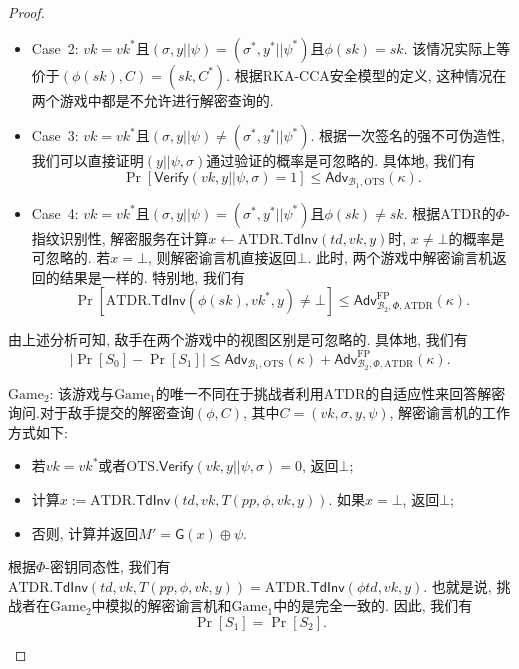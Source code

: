 \begin{proof}
\begin{trivlist}
\begin{itemize}
\item Case~2: $vk = vk^*$且$(\sigma, y||\psi) = (\sigma^*, y^*||\psi^*)$且$\phi(sk) = sk$. 该情况实际上等价于$(\phi(sk), C) = (sk, C^*)$. 根据RKA-CCA安全模型的定义, 这种情况在两个游戏中都是不允许进行解密查询的.

\item Case~3: $vk = vk^*$且$(\sigma, y||\psi) \neq (\sigma^*, y^*||\psi^*)$. 根据一次签名的强不可伪造性, 我们可以直接证明$(y||\psi, \sigma)$通过验证的概率是可忽略的. 具体地, 我们有
\[
\Pr \left[\mathsf{Verify}(vk, y||\psi, \sigma) = 1 \right] \leq \mathsf{Adv}_{\mathcal{B}_1, \text{OTS}}(\kappa).
\]

\item Case~4: $vk = vk^*$且$(\sigma, y||\psi) = (\sigma^*, y^*||\psi^*)$且$\phi(sk) \neq sk$. 根据$\text{ATDR}$的$\Phi$-指纹识别性, 解密服务在计算$x \leftarrow \text{ATDR}.\mathsf{TdInv}(td, vk, y)$时, $x \neq \bot$的概率是可忽略的. 若$x = \bot$, 则解密谕言机直接返回$\bot$. 此时, 两个游戏中解密谕言机返回的结果是一样的. 特别地, 我们有
\[
\Pr \left[\text{ATDR}.\mathsf{TdInv}(\phi(sk), vk^*, y) \neq \bot \right] \leq \mathsf{Adv}_{\mathcal{B}_2, \Phi, \text{ATDR}}^{\text{FP}}(\kappa).
\]
\end{itemize}
由上述分析可知, 敌手在两个游戏中的视图区别是可忽略的. 具体地, 我们有
\begin{equation*}
|\Pr[S_0] - \Pr[S_1]| \leq \mathsf{Adv}_{\mathcal{B}_1, \text{OTS}}(\kappa) + \mathsf{Adv}_{\mathcal{B}_2, \Phi, \text{ATDR}}^{\text{FP}}(\kappa).
\end{equation*}

\item $\text{Game}_2$: 该游戏与$\text{Game}_1$的唯一不同在于挑战者利用$\text{ATDR}$的自适应性来回答解密询问.对于敌手提交的解密查询$(\phi, C)$, 其中$C = (vk, \sigma, y, \psi)$, 解密谕言机的工作方式如下:
\begin{itemize}
\item 若$vk = vk^*$或者$\text{OTS}.\mathsf{Verify}(vk, y||\psi, \sigma) = 0$, 返回$\bot$; 

\item 计算$x :=\text{ATDR}.\mathsf{TdInv}(td, vk, T(pp, \phi, vk, y))$. 如果$x = \bot$, 返回$\bot$;

\item 否则, 计算并返回$M' = \mathsf{G}(x) \oplus \psi$.
\end{itemize}
根据$\Phi$-密钥同态性, 我们有$\text{ATDR}.\mathsf{TdInv}(td, vk, T(pp, \phi, vk, y)) = \text{ATDR}.\mathsf{TdInv}(\phi{td}, vk, y)$. 也就是说, 挑战者在$\text{Game}_2$中模拟的解密谕言机和$\text{Game}_1$中的是完全一致的. 因此, 我们有
\[
\Pr[S_1] = \Pr[S_2].
\]


\end{trivlist}
\end{proof}
